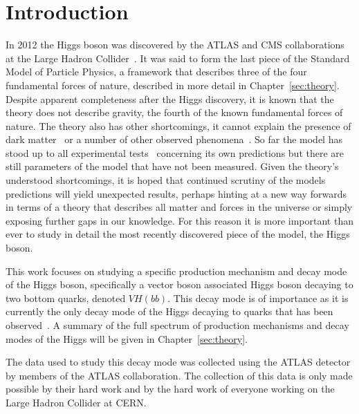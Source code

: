 \chapter{Introduction}%
\label{sec:intro}

In 2012 the Higgs boson was discovered by the ATLAS and CMS collaborations at
the Large Hadron Collider~\cite{DiscoHiggsATLAS, DiscoHiggsCMS}. It was said to
form the last piece of the Standard Model of Particle Physics, a framework that
describes three of the four fundamental forces of nature, described in more
detail in Chapter~\ref{sec:theory}. Despite apparent completeness after the
Higgs discovery, it is known that the theory does not describe gravity, the
fourth of the known fundamental forces of nature. The theory also has other
shortcomings, it cannot explain the presence of dark matter~\cite{DM-ev-sloan,
  DM-ev-nucleosynth, DM-ev-supernova, DM-ev-scaffold, DM-ev-direct,
  DM-ev-strong-lens, DM-ev-candidates, DM-ev-PDG, DM-ev-Zwicky,
  DM-ev-nonbaryonic, DM-ev-particle} or a number of other observed
phenomena~\cite{anom-BD-branching, anom-Dtau-excess, anom-g-2,
  anom-proton-radius, anom-bsll-trans}. So far the model has stood up to all
experimental tests~\cite{EWtests, 1998-SMtests} concerning its own predictions
but there are still parameters of the model that have not been measured. Given
the theory's understood shortcomings, it is hoped that continued scrutiny of the
models predictions will yield unexpected results, perhaps hinting at a new
way forwards in terms of a theory that describes all matter and forces in the
universe or simply exposing further gaps in our knowledge. For this reason it is
more important than ever to study in detail the most recently discovered piece
of the model, the Higgs boson.

This work focuses on studying a specific production mechanism and decay mode of
the Higgs boson, specifically a vector boson associated Higgs boson decaying to
two bottom quarks, denoted $VH(bb)$. This decay mode is of importance as it is
currently the only decay mode of the Higgs decaying to quarks that has been
observed~\cite{vhbb-obs}. A summary of the full spectrum of production
mechanisms and decay modes of the Higgs will be given in
Chapter~\ref{sec:theory}.

The data used to study this decay mode was collected using the ATLAS detector by
members of the ATLAS collaboration. The collection of this data is only made
possible by their hard work and by the hard work of everyone working on the
Large Hadron Collider at CERN.

